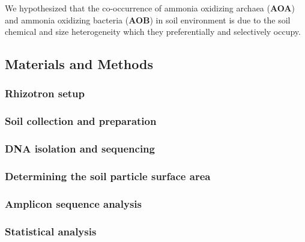 \documentclass[
]{article}
\begin{document}
We hypothesized that the co-occurrence of ammonia oxidizing archaea
(\textbf{AOA}) and ammonia oxidizing bacteria (\textbf{AOB}) in soil
environment is due to the soil chemical and size heterogeneity which
they preferentially and selectively occupy.

\newpage

\hypertarget{materials-and-methods}{%
\subsection{Materials and Methods}\label{materials-and-methods}}

\hypertarget{rhizotron-setup}{%
\subsubsection{Rhizotron setup}\label{rhizotron-setup}}

\hypertarget{soil-collection-and-preparation}{%
\subsubsection{Soil collection and
preparation}\label{soil-collection-and-preparation}}

\hypertarget{dna-isolation-and-sequencing}{%
\subsubsection{DNA isolation and
sequencing}\label{dna-isolation-and-sequencing}}

\hypertarget{determining-the-soil-particle-surface-area}{%
\subsubsection{Determining the soil particle surface
area}\label{determining-the-soil-particle-surface-area}}

\hypertarget{amplicon-sequence-analysis}{%
\subsubsection{Amplicon sequence
analysis}\label{amplicon-sequence-analysis}}

\hypertarget{statistical-analysis}{%
\subsubsection{Statistical analysis}\label{statistical-analysis}}

\newpage
\end{document}
